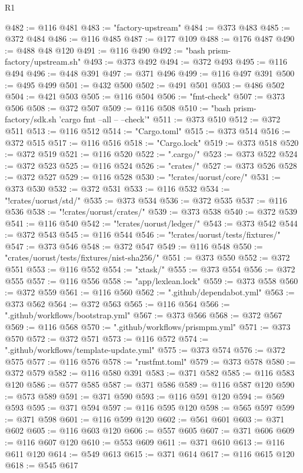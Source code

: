 \begin{lexlean}{R1}
\begin{coremodule}
@482 := @116 @481
@483 := "factory-upstream"
@484 := @373 @483
@485 := @372 @484
@486 := @116 @485
@487 := @177 @109
@488 := @176 @487
@490 := @488 @48 @120
@491 := @116 @490
@492 := "bash prism-factory/upstream.sh"
@493 := @373 @492
@494 := @372 @493
@495 := @116 @494
@496 := @448 @391
@497 := @371 @496
@499 := @116 @497 @391
@500 := @495 @499
@501 := @432 @500
@502 := @491 @501
@503 := @486 @502
@504 := @421 @503
@505 := @116 @504
@506 := "fmt-check"
@507 := @373 @506
@508 := @372 @507
@509 := @116 @508
@510 := "bash prism-factory/sdk.sh 'cargo fmt --all -- --check'"
@511 := @373 @510
@512 := @372 @511
@513 := @116 @512
@514 := "Cargo.toml"
@515 := @373 @514
@516 := @372 @515
@517 := @116 @516
@518 := "Cargo.lock"
@519 := @373 @518
@520 := @372 @519
@521 := @116 @520
@522 := ".cargo/"
@523 := @373 @522
@524 := @372 @523
@525 := @116 @524
@526 := "crates/"
@527 := @373 @526
@528 := @372 @527
@529 := @116 @528
@530 := "!crates/uorust/core/"
@531 := @373 @530
@532 := @372 @531
@533 := @116 @532
@534 := "!crates/uorust/std/"
@535 := @373 @534
@536 := @372 @535
@537 := @116 @536
@538 := "!crates/uorust/crates/"
@539 := @373 @538
@540 := @372 @539
@541 := @116 @540
@542 := "!crates/uorust/ledger/"
@543 := @373 @542
@544 := @372 @543
@545 := @116 @544
@546 := "!crates/uorust/tests/fixtures/"
@547 := @373 @546
@548 := @372 @547
@549 := @116 @548
@550 := "crates/uorust/tests/fixtures/nist-sha256/"
@551 := @373 @550
@552 := @372 @551
@553 := @116 @552
@554 := "xtask/"
@555 := @373 @554
@556 := @372 @555
@557 := @116 @556
@558 := "app/lexlean.lock"
@559 := @373 @558
@560 := @372 @559
@561 := @116 @560
@562 := ".github/dependabot.yml"
@563 := @373 @562
@564 := @372 @563
@565 := @116 @564
@566 := ".github/workflows/bootstrap.yml"
@567 := @373 @566
@568 := @372 @567
@569 := @116 @568
@570 := ".github/workflows/prismpm.yml"
@571 := @373 @570
@572 := @372 @571
@573 := @116 @572
@574 := ".github/workflows/template-update.yml"
@575 := @373 @574
@576 := @372 @575
@577 := @116 @576
@578 := "rustfmt.toml"
@579 := @373 @578
@580 := @372 @579
@582 := @116 @580 @391
@583 := @371 @582
@585 := @116 @583 @120
@586 := @577 @585
@587 := @371 @586
@589 := @116 @587 @120
@590 := @573 @589
@591 := @371 @590
@593 := @116 @591 @120
@594 := @569 @593
@595 := @371 @594
@597 := @116 @595 @120
@598 := @565 @597
@599 := @371 @598
@601 := @116 @599 @120
@602 := @561 @601
@603 := @371 @602
@605 := @116 @603 @120
@606 := @557 @605
@607 := @371 @606
@609 := @116 @607 @120
@610 := @553 @609
@611 := @371 @610
@613 := @116 @611 @120
@614 := @549 @613
@615 := @371 @614
@617 := @116 @615 @120
@618 := @545 @617

\end{coremodule}
\end{lexlean}
